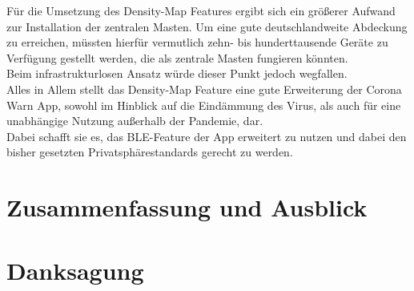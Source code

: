 \documentclass[conference]{IEEEtran}
\begin{document}
Für die Umsetzung des Density-Map Features ergibt sich ein größerer Aufwand zur Installation der zentralen Masten. Um eine gute deutschlandweite Abdeckung zu erreichen, müssten hierfür vermutlich zehn- bis hunderttausende Geräte zu Verfügung gestellt werden, die als zentrale Masten fungieren könnten.\\
Beim infrastrukturlosen Ansatz würde dieser Punkt jedoch wegfallen.\\

Alles in Allem stellt das Density-Map Feature eine gute Erweiterung der Corona Warn App, sowohl im Hinblick auf die Eindämmung des Virus, als auch für eine unabhängige Nutzung außerhalb der Pandemie, dar.\\
Dabei schafft sie es, das BLE-Feature der App erweitert zu nutzen und dabei den bisher gesetzten Privatsphärestandards gerecht zu werden. 

\section{Zusammenfassung und Ausblick} \label{conclusion}

\section*{Danksagung}
\end{document}

